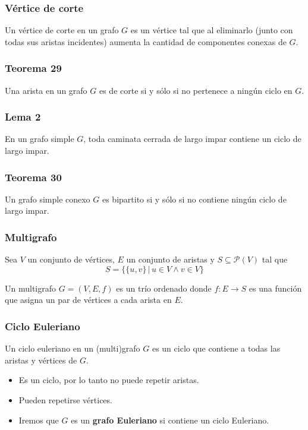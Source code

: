 \begin{multicols}{2}
    \subsubsection*{Vértice de corte}
    Un vértice de corte en un grafo $G$ es un vértice tal que al eliminarlo (junto con todas sus aristas incidentes) aumenta la cantidad de componentes conexas de $G$.
    
    \subsubsection*{Teorema 29}
    Una arista en un grafo $G$ es de corte si y sólo si no pertenece a ningún ciclo en $G$.
    
    \subsubsection*{Lema 2}
    En un grafo simple $G$, toda caminata cerrada de largo impar contiene un ciclo de largo impar.
    
    \subsubsection*{Teorema 30}
    Un grafo simple conexo $G$ es bipartito si y sólo si no contiene ningún ciclo de largo impar.
    
    \subsubsection*{Multigrafo}
    Sea $V$ un conjunto de vértices, $E$ un conjunto de aristas y $S \subseteq \mathcal{P}(V)$ tal que
    $$
    S = \{ \{u,v\} \,|\, u \in V \wedge v \in V\}
    $$
    
    Un multigrafo $G = (V, E, f)$ es un trío ordenado donde $f: E \rightarrow S$ es una función que asigna un par de vértices a cada arista en $E$.
    
    \subsubsection*{Ciclo Euleriano}
    Un ciclo euleriano en un (multi)grafo $G$ es un ciclo que contiene a todas las aristas y vértices de $G$.
    \begin{itemize}
        \item Es un ciclo, por lo tanto no puede repetir aristas.
        \item Pueden repetirse vértices.
        \item Iremos que $G$ es un \textbf{grafo Euleriano} si contiene un ciclo Euleriano.
    \end{itemize}
    

\end{multicols}

